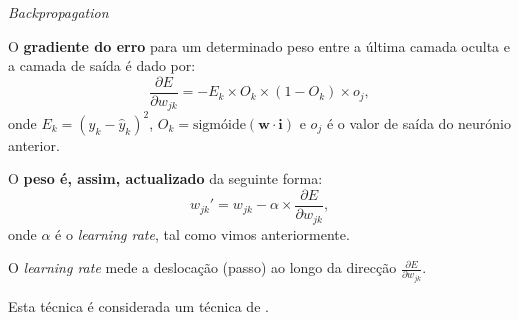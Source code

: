 \begin{frame}{\textit{Backpropagation} \cont}
   
    O \textbf{gradiente do erro} para um determinado peso entre a última camada oculta e a camada de saída é dado por:
    \begin{equation}
        \frac{\partial E}{\partial w_{jk}} = -E_k \times O_k \times (1-O_k) \times o_j,
    \end{equation}
    onde $E_k = (y_k - \hat{y}_k)^2$, $O_k = \text{sigmóide}\left(\mathbf{w} \cdot \mathbf{i} \right)$ e $o_j$ é o valor de saída do neurónio anterior. 
    
    \pauseskip
    
    O \textbf{peso é, assim, actualizado} da seguinte forma:
    \begin{equation}
        w_{jk}' = w_{jk} - \alpha \times \frac{\partial E}{\partial w_{jk}},
    \end{equation}
    onde $\alpha$ é o \textit{learning rate}, tal como vimos anteriormente. 
    
    \pauseskip
    
    O \textit{learning rate} mede a deslocação (passo) ao longo da direcção $\frac{\partial E}{\partial w_{jk}}$.
    
    \pauseskip
    
    Esta técnica é considerada um técnica de \textit{}.
    
    
\end{frame}

